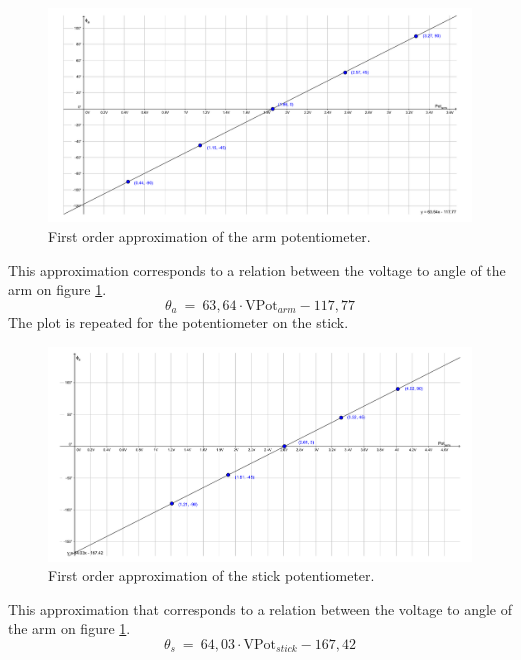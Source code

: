 \begin{figure}[htbp]
\hspace*{-3cm}  
\centering
\includegraphics[width=0.95\paperwidth]{figures/appendix/PotentiometerPlot.pdf}
\caption{First order approximation of the arm potentiometer.}
\label{fig:PotentiometerPlot}
\end{figure}
\bigbreak

This approximation corresponds to a relation between the voltage to angle of the arm on figure \ref{fig:PotentiometerPlot}.
\begin{equation}
\theta_a\ =\ 63,64 \cdot \text{VPot}_{arm} - 117,77
\end{equation}
\newpage
The plot is repeated for the potentiometer on the stick.
\begin{figure}[htbp]  
\hspace*{-3cm}
\centering
\includegraphics[width=0.95\paperwidth]{figures/appendix/PotentiometerPlotStick.pdf}
\caption{First order approximation of the stick potentiometer.}
\label{fig:PotentiometerPlotStick}
\end{figure}

This approximation that corresponds to a relation between the voltage to angle of the arm on figure \ref{fig:PotentiometerPlot}.
\begin{equation}
\theta_s\ =\ 64,03 \cdot \text{VPot}_{stick} - 167,42
\end{equation}

